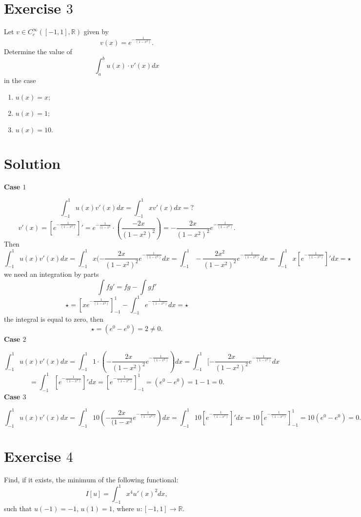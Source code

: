 \documentclass[a4paper, twoside, openany]{book}
\newcommand{\R}{\mathbb{R}}
\begin{document}
\section*{Exercise $3$}
Let $v \in C_c^{\infty}([-1, 1], \R)$ given by
$$v(x) = e^{-\frac{1}{(1 - x^2)}}.$$
Determine the value of 
$$\int_a^b u(x) \cdot v'(x) dx$$
in the case
\begin{enumerate}
\item $u(x) = x$;
\item $u(x) = 1$;
\item $u(x) = 10$.
\end{enumerate}
\section*{Solution}
\textbf{ Case $1$} \par 
$$\int_{-1}^1 u(x) v'(x) dx = \int_{-1}^1 x v'(x) dx = ?$$
$$v'(x) = [ e^{-\frac{1}{(1 - x^2)}}]' = e^{-\frac{1}{(1 - x^2}} \cdot (\frac{- 2x }{(1 - x^2)^2}) = -\frac{2x}{(1 - x^2)^2}e^{-\frac{1}{(1 - x^2)}}.$$
Then
$$\int_{-1}^1 u(x) v'(x) dx = \int_{-1}^1 x(-\frac{2x}{(1 - x^2)^2} e^{-\frac{1}{(1 - x^2)}} dx = \int_{-1}^1 -\frac{2 x^2}{(1 - x^2)^2}e^{-\frac{1}{(1 - x^2)}} dx = \int_{-1}^1 x [e^{-\frac{1}{(1 - x^2)}}]' dx = \star$$
we need an integration by parts
$$\int f g' = fg - \int g f'$$
$$\star = [x e^{-\frac{1}{(1 - x^2)}}]_{-1}^1 - \int_{-1}^1 e^{-\frac{1}{(1 - x^2)}} dx = \star$$
the integral is equal to zero, then
$$\star = (e^0 - e^0) = 2 \neq 0.$$
\textbf{ Case $2$} \par 
$$\int_{-1}^1 u(x) v'(x) dx = \int_{-1}^1 1 \cdot ( -\frac{2x}{(1 - x^2)^2}e^{-\frac{1}{(1 - x^2)}}) dx = \int_{-1}^1 [-\frac{2x}{(1 - x^2)^2} e^{-\frac{1}{(1 -  x^2)}} dx$$
$$ = \int_{-1}^1 [e^{-\frac{1}{(1 - x^2)}}]' dx = [e^{-\frac{1}{(1 - x^2)}}]_{-1}^1 = (e^0 - e^0) = 1 - 1 = 0.$$
\textbf{ Case $3$} \par 
$$\int_{-1}^1 u(x) v'(x) dx = \int_{-1}^1 10 (-\frac{2x}{(1 -x^2} e^{-\frac{1}{(1 - x^2)}}) dx = \int_{-1}^1 10 [e^{-\frac{1}{(1 - x^2)}}]' dx = 10 [e^{-\frac{1}{(1 - x^2)}}]_{-1}^1 = 10 (e^0 - e^0) = 0.$$
\clearpage
\section*{Exercise $4$}
Find, if it exists, the minimum of the following functional:
$$I[u] = \int_{-1}^1 x^4 u'(x)^2 dx,$$
such that $u(-1) = -1$, $u(1) = 1$,  where $u: [-1, 1] \rightarrow \R$.
\end{document}

